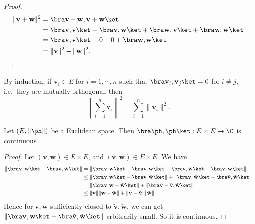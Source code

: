 \documentclass[a4paper]{article}
\begin{document}
\begin{proof}
  \begin{align*}
    \|\mathbf{v} + \mathbf{w}\|^2 &= \bra \mathbf{v} + \mathbf{w}, \mathbf{v} + \mathbf{w}\ket\\
    &= \bra \mathbf{v}, \mathbf{v}\ket + \bra \mathbf{v}, \mathbf{w}\ket + \bra \mathbf{w}, \mathbf{v} \ket + \bra \mathbf{w}, \mathbf{w}\ket\\
    &= \bra \mathbf{v}, \mathbf{v}\ket + 0 + 0 + \bra \mathbf{w}, \mathbf{w}\ket\\
    &= \|\mathbf{v}\|^2 + \|\mathbf{w}\|^2.
  \end{align*}
\end{proof}
By induction, if $\mathbf{v}_i \in E$ for $i = 1,\cdots, n$ such that $\bra \mathbf{v}_i, \mathbf{v}_j\ket = 0$ for $i \not= j$, i.e.\ they are mutually orthogonal, then
\[
  \left\|\sum_{i = 1}^n \mathbf{v}_i\right\|^2 = \sum_{i = 1}^n \|\mathbf{v}_i\|^2.
\]
\begin{prop}
  Let $(E, \|\ph\|)$ be a Euclidean space. Then $\bra \ph, \ph\ket: E \times E \to \C$ is continuous.
\end{prop}

\begin{proof}
  Let $(\mathbf{v}, \mathbf{w}) \in E\times E$, and $(\tilde{\mathbf{v}}, \tilde{\mathbf{w}}) \in E\times E$. We have
  \begin{align*}
    \|\bra \mathbf{v}, \mathbf{w}\ket - \bra \tilde{\mathbf{v}}, \tilde{\mathbf{w}}\ket\| &= \|\bra \mathbf{v}, \mathbf{w}\ket - \bra \mathbf{v}, \tilde{\mathbf{w}}\ket + \bra \mathbf{v}, \tilde{\mathbf{w}}\ket - \bra \tilde{\mathbf{v}}, \tilde{\mathbf{w}}\ket\|\\
    &\leq \|\bra \mathbf{v}, \mathbf{w}\ket - \bra \mathbf{v}, \tilde{\mathbf{w}}\ket\| + \|\bra \mathbf{v}, \tilde{\mathbf{w}}\ket - \bra \tilde{\mathbf{v}}, \tilde{\mathbf{w}}\ket\|\\
    &= \|\bra \mathbf{v}, \mathbf{w} - \tilde{\mathbf{w}}\ket \| + \|\bra \mathbf{v} - \tilde{\mathbf{v}}, \tilde{\mathbf{w}}\ket \|\\
    &\leq \|\mathbf{v}\| \|\mathbf{w} - \tilde{\mathbf{w}}\| + \|\mathbf{v} - \tilde{\mathbf{v}}\|\|\tilde{\mathbf{w}}\|
  \end{align*}
  Hence for $\mathbf{v}, \mathbf{w}$ sufficiently closed to $\tilde{\mathbf{v}}, \tilde{\mathbf{w}}$, we can get $\|\bra \mathbf{v}, \mathbf{w}\ket - \bra \tilde{\mathbf{v}}, \tilde{\mathbf{w}}\ket\|$ arbitrarily small. So it is continuous.
\end{proof}
\end{document}
